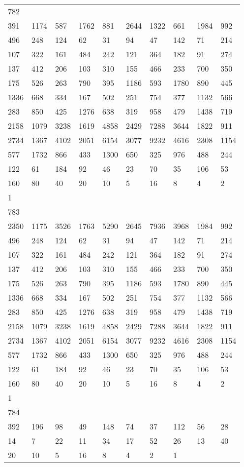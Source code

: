 \begin{longtable}{*{10}{l}}
782&&&&&&&&&\\
391& 1174& 587& 1762& 881& 2644& 1322& 661& 1984& 992\\
496& 248& 124& 62& 31& 94& 47& 142& 71& 214\\
107& 322& 161& 484& 242& 121& 364& 182& 91& 274\\
137& 412& 206& 103& 310& 155& 466& 233& 700& 350\\
175& 526& 263& 790& 395& 1186& 593& 1780& 890& 445\\
1336& 668& 334& 167& 502& 251& 754& 377& 1132& 566\\
283& 850& 425& 1276& 638& 319& 958& 479& 1438& 719\\
2158& 1079& 3238& 1619& 4858& 2429& 7288& 3644& 1822& 911\\
2734& 1367& 4102& 2051& 6154& 3077& 9232& 4616& 2308& 1154\\
577& 1732& 866& 433& 1300& 650& 325& 976& 488& 244\\
122& 61& 184& 92& 46& 23& 70& 35& 106& 53\\
160& 80& 40& 20& 10& 5& 16& 8& 4& 2\\
1& \\

783&&&&&&&&&\\
2350& 1175& 3526& 1763& 5290& 2645& 7936& 3968& 1984& 992\\
496& 248& 124& 62& 31& 94& 47& 142& 71& 214\\
107& 322& 161& 484& 242& 121& 364& 182& 91& 274\\
137& 412& 206& 103& 310& 155& 466& 233& 700& 350\\
175& 526& 263& 790& 395& 1186& 593& 1780& 890& 445\\
1336& 668& 334& 167& 502& 251& 754& 377& 1132& 566\\
283& 850& 425& 1276& 638& 319& 958& 479& 1438& 719\\
2158& 1079& 3238& 1619& 4858& 2429& 7288& 3644& 1822& 911\\
2734& 1367& 4102& 2051& 6154& 3077& 9232& 4616& 2308& 1154\\
577& 1732& 866& 433& 1300& 650& 325& 976& 488& 244\\
122& 61& 184& 92& 46& 23& 70& 35& 106& 53\\
160& 80& 40& 20& 10& 5& 16& 8& 4& 2\\
1& \\

784&&&&&&&&&\\
392& 196& 98& 49& 148& 74& 37& 112& 56& 28\\
14& 7& 22& 11& 34& 17& 52& 26& 13& 40\\
20& 10& 5& 16& 8& 4& 2& 1& \\


\end{longtable}
